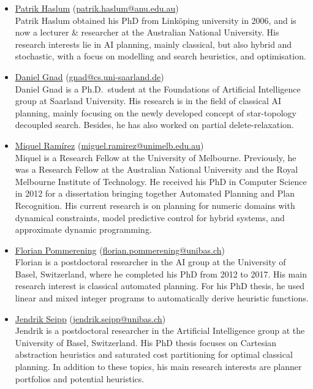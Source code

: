 \documentclass[10pt]{article}
\begin{document}
\begin{itemize}

\item \href{https://users.cecs.anu.edu.au/~patrik/}{Patrik Haslum}
(\href{mailto:patrik.haslum@anu.edu.au}{patrik.haslum@anu.edu.au})\\
Patrik Haslum obtained his PhD from Link\"oping university in 2006,
and is now a lecturer \& researcher at the Australian National
University. His research interests lie in AI planning, mainly classical,
but also hybrid and stochastic, with a focus on modelling and search
heuristics, and optimisation.

\item \href{http://}{Daniel Gnad}
(\href{mailto:gnad@cs.uni-saarland.de}{gnad@cs.uni-saarland.de})\\
Daniel Gnad is a Ph.D.\ student at the Foundations of Artificial
Intelligence group at Saarland University. His research is in the field 
of classical AI planning, mainly focusing on the newly developed concept 
of star-topology decoupled search. Besides, he has also worked on partial
delete-relaxation.

\item \href{http://findanexpert.unimelb.edu.au/display/person778610#tab-overview}{Miquel Ram\'{i}rez}
(\href{mailto:miguel.ramirez@unimelb.edu.au}{miguel.ramirez@unimelb.edu.au})\\
Miquel is a Research Fellow at the University of Melbourne. Previously, he was
a Research Fellow at the Australian National University and the Royal Melbourne
Institute of Technology. He
received his PhD in Computer Science in 2012 for a dissertation
bringing together Automated Planning and Plan Recognition. His current
research is on planning for numeric domains with dynamical constraints, model predictive
control for hybrid systems, and approximate dynamic programming.

 \item \href{http://ai.cs.unibas.ch/people/pommeren}{Florian Pommerening}
   (\href{mailto:florian.pommerening@unibas.ch}{florian.pommerening@unibas.ch})\\
  Florian is a postdoctoral researcher in the AI group at the University of Basel,
  Switzerland, where he completed his PhD from 2012 to 2017. His main
  research interest is classical automated planning. For his PhD
  thesis, he used linear and mixed integer programs to
  automatically derive heuristic functions.

 \item \href{http://ai.cs.unibas.ch/people/seipp}{Jendrik Seipp}
   (\href{mailto:jendrik.seipp@unibas.ch}{jendrik.seipp@unibas.ch})\\
   Jendrik is a postdoctoral researcher in the Artificial Intelligence
   group at the University of Basel, Switzerland. His PhD thesis focuses
   on Cartesian abstraction heuristics and saturated cost partitioning
   for optimal classical planning. In addition to these topics, his main
   research interests are planner portfolios and potential heuristics.


\end{itemize}
\end{document}
